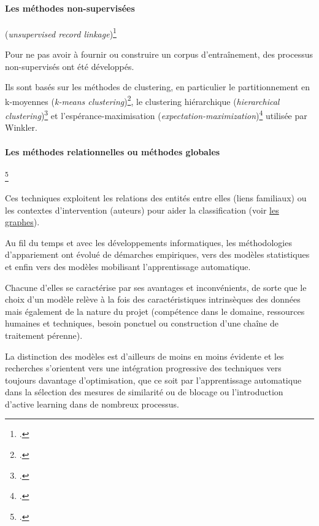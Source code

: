 \documentclass[a4paper,12pt,twoside]{book}
\begin{document}
			    \paragraph{Les \textbf{méthodes non-supervisées}} (\textit{unsupervised record linkage})\footcite[][pp.~150-153]{christenDataMatchingConcepts2012}
			    
			    Pour ne pas avoir à fournir ou construire un corpus d'entraînement, des processus non-supervisés ont été développés.
			    
			    Ils sont basés sur les méthodes de clustering, en particulier le partitionnement en k-moyennes (\textit{k-means clustering})\footcite{Kmoyennes2022}, le clustering hiérarchique (\textit{hierarchical clustering})\footcite{RegroupementHierarchique2022} et l'espérance-maximisation (\textit{expectation-maximization})\footcite{AlgorithmeEsperancemaximisation2022} utilisée par Winkler.
			    
			    \paragraph{Les \textbf{méthodes relationnelles} ou méthodes globales}\footcite[][pp.~154-157]{christenDataMatchingConcepts2012}
			    
			    Ces techniques exploitent les relations des entités entre elles (liens familiaux) ou les contextes d'intervention (auteurs) pour aider la classification (voir \hyperref[graph]{les graphes}).
			    
			    \pagebreak
			    Au fil du temps et avec les développements informatiques, les méthodologies d'appariement ont évolué de démarches empiriques, vers des modèles statistiques et enfin vers des modèles mobilisant l'apprentissage automatique.
			    
			    Chacune d'elles se caractérise par ses avantages et inconvénients, de sorte que le choix d'un modèle relève à la fois des caractéristiques intrinsèques des données mais également de la nature du projet (compétence dans le domaine, ressources humaines et techniques, besoin ponctuel ou construction d'une chaîne de traitement pérenne).
			    
			    La distinction des modèles est d'ailleurs de moins en moins évidente et les recherches s'orientent vers une intégration progressive des techniques vers toujours davantage d'optimisation, que ce soit par l'apprentissage automatique dans la sélection des mesures de similarité ou de blocage ou l'introduction d'active learning dans de nombreux processus.
\end{document}

